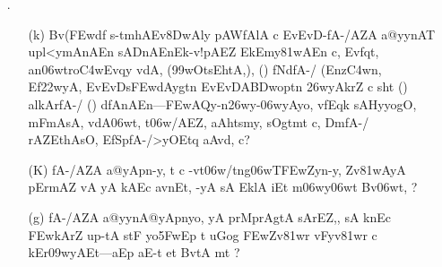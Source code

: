 \begin{itemize}
 \item[{\dn \dnnum \rn{17}}.]
                  \begin{itemize}
                   \item[({\dn k})]{\dn Bv(\3FEwd\?f\? s\2-tmhAEv\38DwAly\? pAWfAlA c EvEvD{\rs -\re}\-fA-/AZA a@yynAT\0 upl<ymAnAEn sADnAEn\break Ek\2-v!pAEZ EkEm\2y\381wAEn c{\rs ,\re} Evf\?qt, an\306wtro\3C4w\?\break Evqy\? v\?dA, {\rs (\re}\399wOtsEhtA,{\rs ),\re} {\rs (\re}{\dn \dnnum {}}{\rs )\re} fNdfA-/ {\rs (\re}Enz\3C4w\?n{\rs ,\re} Ef\322wyA{\rs ,\re} EvEvD\-s\2\3FEwdAygt\?n EvEvDA\3BDwop\?t\?n \326wyAkrZ\? c sht {\rs (\re}{\dn \dnnum {}}{\rs )\re} al\2kArfA-/ {\rs (\re}{\dn \dnnum {}}{\rs )\re} dfA\0nAEn{\rs ---\re}\3FEwAQy{\rs -\re}n\326wy{\rs -\re}\306wyAyo{\rs ,\re} v\4f\?Eqk sA\2HyyogO{\rs ,\re} mFmA\2sA{\rs ,\re} v\?dA\306wt, t\306w/AEZ{\rs ,\re} aAh\0tsmy, sOgtmt\2 c{\rs ,\re} Dm\0fA-/ rAZ\?EthAsO{\rs ,\re} EfSpfA-/\break >yOEtq aAv\?{\qvb}d, c{\rs ?\re}} 
 
                   \item[({\dn K})] {\dn fA-/AZA a@yApn-y{\rs ,\re} t\? c -vt\306w/tng\5\306wT\-\3FEwZyn-y{\rs ,\re} Zv\381wAyA\2 pErmAZ\? vA yA kAEc avnEt, -yA sA Ek\2lA iEt m\306wy\306wt\? Bv\306wt, {\rs ?\re} }
 
                   \item[({\dn g})] {\dn fA-/AZA a@yynA@yApnyo, yA prMprAgtA sArEZ,{\rs ,\re} sA k\?nEc \3FEwkAr\?Z up-tA stF yo\35FwEp t uGog\2 \3FEwZv\381wr\2 vFy\0v\381wr\2 c kEr\309wyAEt{\rs ---\re}aEp aE-t et BvtA mt {\rs ?\re}} 
 \end{itemize}
 \end{itemize}
 
